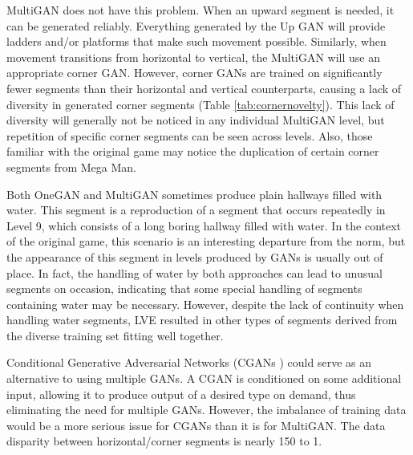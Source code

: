 MultiGAN does not have this problem. When an upward segment is needed, it can be generated reliably. Everything generated by the Up GAN will provide ladders and/or platforms that make such movement possible. Similarly, when movement transitions from horizontal to vertical, the MultiGAN will use an appropriate corner GAN.
However, corner GANs are trained on significantly fewer segments than their horizontal and vertical counterparts, causing a lack of diversity in generated corner segments (Table \ref{tab:cornernovelty}). This lack of diversity will generally not be noticed in any individual MultiGAN level, but repetition of specific corner segments can be seen across levels. 
Also, those familiar with the original game may notice the duplication of certain corner segments from Mega Man.


Both OneGAN and MultiGAN sometimes produce plain hallways filled with water.
This segment is a reproduction of a segment that occurs repeatedly in Level 9, which consists of a long boring hallway filled with water. In the context of the original game, this scenario is an interesting departure from the norm, but the appearance of this segment in levels produced by GANs is usually out of place. In fact, the handling of water by both approaches can lead to unusual segments on occasion, indicating that some special handling of segments containing water may be necessary. However, despite the lack of continuity when handling water segments, LVE resulted in other types of segments derived from the diverse training set fitting well together.


Conditional Generative Adversarial Networks (CGANs \cite{mirza2014conditional}) could serve as an alternative to using multiple GANs. A CGAN is conditioned on some additional input, allowing it to produce output of a desired type on demand, thus eliminating the need for multiple GANs. 
However, the imbalance of training data would be a more serious issue for CGANs than it is for MultiGAN. The data disparity between horizontal/corner segments is nearly 150 to 1.

